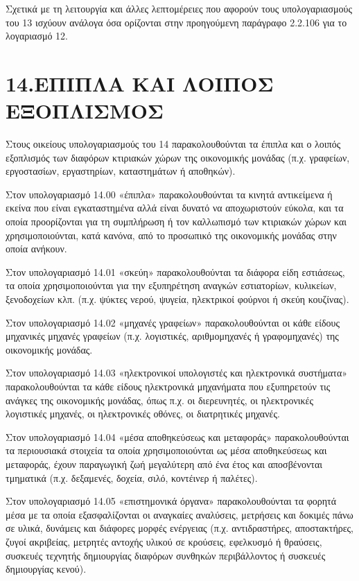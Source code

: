 \documentclass[A4,10pt,greek]{book}
\begin{document}
Σχετικά με τη λειτουργία και άλλες λεπτομέρειες που αφορούν τους υπολογαριασμούς του 13 ισχύουν ανάλογα όσα ορίζονται στην προηγούμενη παράγραφο 2.2.106 για το λογαριασμό 12.

\section{14.ΕΠΙΠΛΑ ΚΑΙ ΛΟΙΠΟΣ ΕΞΟΠΛΙΣΜΟΣ}

Στους οικείους υπολογαριασμούς του 14 παρακολουθούνται τα έπιπλα και ο λοιπός εξοπλισμός των διαφόρων κτιριακών χώρων της οικονομικής μονάδας (π.χ.  γραφείων, εργοστασίων, εργαστηρίων, καταστημάτων ή αποθηκών).

Στον υπολογαριασμό 14.00 «έπιπλα» παρακολουθούνται τα κινητά αντικείμενα ή εκείνα που είναι εγκαταστημένα αλλά είναι δυνατό να αποχωριστούν εύκολα, και τα οποία προορίζονται για τη συμπλήρωση ή τον καλλωπισμό των κτιριακών χώρων και χρησιμοποιούνται, κατά κανόνα, από το προσωπικό της οικονομικής μονάδας στην οποία ανήκουν.

Στον υπολογαριασμό 14.01 «σκεύη» παρακολουθούνται τα διάφορα είδη εστιάσεως, τα οποία χρησιμοποιούνται για την εξυπηρέτηση αναγκών εστιατορίων, κυλικείων, ξενοδοχείων κλπ. (π.χ. ψύκτες νερού, ψυγεία, ηλεκτρικοί φούρνοι ή σκεύη κουζίνας).

Στον υπολογαριασμό 14.02 «μηχανές γραφείων» παρακολουθούνται οι κάθε είδους μηχανικές μηχανές γραφείων (π.χ. λογιστικές, αριθμομηχανές ή γραφομηχανές) της οικονομικής μονάδας.

Στον υπολογαριασμό 14.03 «ηλεκτρονικοί υπολογιστές και ηλεκτρονικά συστήματα» παρακολουθούνται τα κάθε είδους ηλεκτρονικά μηχανήματα που εξυπηρετούν τις ανάγκες της οικονομικής μονάδας, όπως π.χ. οι διερευνητές, οι ηλεκτρονικές λογιστικές μηχανές, οι ηλεκτρονικές οθόνες, οι διατρητικές μηχανές.

Στον υπολογαριασμό 14.04 «μέσα αποθηκεύσεως και μεταφοράς» παρακολουθούνται τα περιουσιακά στοιχεία τα οποία χρησιμοποιούνται ως μέσα αποθηκεύσεως και μεταφοράς, έχουν παραγωγική ζωή μεγαλύτερη από ένα έτος και αποσβένονται τμηματικά (π.χ. δεξαμενές, δοχεία, σιλό, κοντέινερ ή παλέτες).

Στον υπολογαριασμό 14.05 «επιστημονικά όργανα» παρακολουθούνται τα φορητά μέσα με τα οποία εξασφαλίζονται οι αναγκαίες αναλύσεις, μετρήσεις και δοκιμές πάνω σε υλικά, δυνάμεις και διάφορες μορφές ενέργειας (π.χ. αντιδραστήρες, αποστακτήρες, ζυγοί ακριβείας, μετρητές αντοχής υλικού σε κρούσεις, εφελκυσμό ή θραύσεις, συσκευές τεχνητής δημιουργίας διαφόρων συνθηκών περιβάλλοντος ή συσκευές δημιουργίας κενού).
\end{document}
